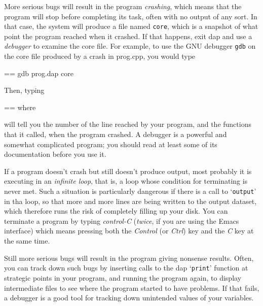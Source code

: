 \documentclass{book}
\makeatletter
\newcommand\Texinfocommandstyletextkbd[1]{{\ttfamily\textsl{#1}}}%
\newenvironment{Texinfopreformatted}{%
  \par\GNUTobeylines\obeyspaces\frenchspacing\parskip=\z@\parindent=\z@}{}
{\catcode`\^^M=13 \gdef\GNUTobeylines{\catcode`\^^M=13 \def^^M{\null\par}}}
\newenvironment{Texinfoindented}{\begin{list}{}{}\item\relax}{\end{list}}
\renewcommand{\_}{\Texinfounderscore\discretionary{}{}{}}
\makeatother
\begin{document}
More serious bugs will result in the program \textsl{crashing}, which
means that the program will stop before completing
its task, often with no output of any sort.
In that case, the system will produce a file named \texttt{core}, which
is a snapshot of what point the program reached when it crashed.
If that happens, exit dap and use a \textsl{debugger} to examine the
core file.  For example, to use the GNU debugger \texttt{gdb} on the
core file produced by a crash in prog.cpp, you would type

\begin{Texinfoindented}
\begin{Texinfopreformatted}%
\ttfamily gdb prog.dap core
\end{Texinfopreformatted}
\end{Texinfoindented}
\noindent{}Then, typing

\begin{Texinfoindented}
\begin{Texinfopreformatted}%
\ttfamily where
\end{Texinfopreformatted}
\end{Texinfoindented}
\noindent{}will tell you the number of the line reached by your program,
and the functions that it called, when the program crashed.
A debugger is a powerful and somewhat complicated program; you should
read at least some of its documentation before you use it.

If a program doesn't crash but still doesn't produce output, most probably
it is executing in an \textsl{infinite loop}, that is, a loop whose condition
for terminating is never met.  Such a situation is particularly
dangerous if there is a call to `\texttt{output}' in tha loop, so that
more and more lines are being written to the output dataset, which therefore
runs the risk of completely filling up your disk.
You can terminate
%
%
%
a program by typing \textsl{control-C} (\emph{twice}, if you are using the
Emacs interface) which means pressing both the
\Texinfocommandstyletextkbd{Control} (or \Texinfocommandstyletextkbd{Ctrl}) key and the \Texinfocommandstyletextkbd{C} key at the same time.

Still more serious bugs will result in the program giving nonsense
results.
Often, you can track down such bugs by inserting calls
to the dap `\texttt{print}' function at strategic points
in your program, and running the program again,
to display intermediate files to see where the program started
to have problems.
If that fails, a debugger is a good tool for tracking down
unintended values of your variables.
\end{document}
